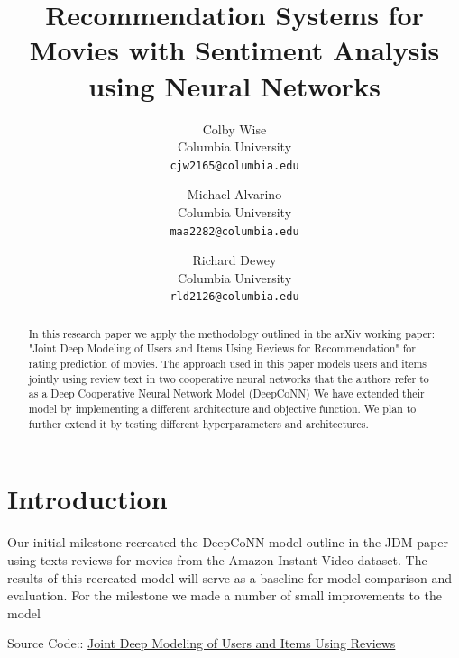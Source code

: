 \documentclass[10pt,twocolumn,letterpaper]{article}
\begin{document}
\title{Recommendation Systems for Movies with Sentiment Analysis using Neural Networks}

\author{Colby Wise\\
Columbia University\\
{\tt\small cjw2165@columbia.edu}
\and
Michael Alvarino\\
Columbia University\\
{\tt\small maa2282@columbia.edu}
\and
Richard Dewey\\
Columbia University\\
{\tt\small rld2126@columbia.edu}
}

\maketitle

\begin{abstract}
   In this research paper we apply the methodology outlined in the
   arXiv working paper: "Joint Deep Modeling of Users and Items Using Reviews for Recommendation" 
   for rating prediction of movies. The approach used in this paper
   models users and items jointly using review text in two cooperative neural networks that 
   the authors refer to as a Deep Cooperative Neural Network Model (DeepCoNN)  
   We have extended their model by implementing a different architecture and 
   objective function. We plan to further extend it by testing different hyperparameters
   and architectures.
\end{abstract}

\section{Introduction}

Our initial milestone recreated the 
DeepCoNN model outline in the JDM paper using texts reviews for movies from 
the Amazon Instant Video dataset. The results of this recreated model 
will serve as a baseline for model comparison and evaluation.
For the milestone we made a number of small improvements to the model
   
   Source Code:: \href{https://github.com/michaelAlvarino/Deep-Learning}
   {Joint Deep Modeling of Users and Items Using Reviews}
\end{document}
